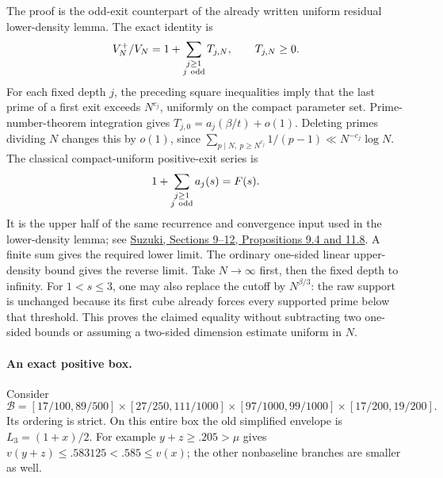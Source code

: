 \documentclass[11pt]{article}
\begin{document}
The proof is the odd-exit counterpart of the already written
uniform residual lower-density lemma. The exact identity is
\[
 V_N^+/V_N=1+\sum_{\substack{j\ge1\\j\ {\rm odd}}}T_{j,N},
 \qquad T_{j,N}\ge0.
\]
For each fixed depth \(j\), the preceding square inequalities imply
that the last prime of a first exit exceeds \(N^{c_j}\), uniformly
on the compact parameter set. Prime-number-theorem integration gives
\(T_{j,0}=a_j(\beta/t)+o(1)\).
Deleting primes dividing \(N\) changes this by \(o(1)\), since
\(\sum_{p\mid N,\ p\ge N^{c_j}}1/(p-1)
 \ll N^{-c_j}\log N\).
The classical compact-uniform positive-exit series is
\[
 1+\sum_{\substack{j\ge1\\j\ {\rm odd}}}a_j(s)=F(s).
\]
It is the upper half of the same recurrence and convergence input
used in the lower-density lemma; see
\href{https://www.suzuyu1729.com/notes/NagoyaSeminar2022/RosserIwaniec.pdf}
{Suzuki, Sections 9--12, Propositions 9.4 and 11.8}.
A finite sum gives the required lower limit. The ordinary one-sided
linear upper-density bound gives the reverse limit.
Take \(N\to\infty\) first, then the fixed depth to infinity.
For \(1<s\le3\), one may also replace the cutoff by \(N^{\beta/3}\):
the raw support is unchanged because its first cube already forces
every supported prime below that threshold.
This proves the claimed equality without subtracting two one-sided
bounds or assuming a two-sided dimension estimate uniform in \(N\).

\paragraph{An exact positive box.}
Consider
\[
 \mathcal B=
 [17/100,89/500]\times[27/250,111/1000]
 \times[97/1000,99/1000]\times[17/200,19/200].
\]
Its ordering is strict. On this entire box the old simplified
envelope is \(L_3=(1+x)/2\).
For example \(y+z\ge.205>\mu\) gives
\(v(y+z)\le.583125<.585\le v(x)\); the other nonbaseline
branches are smaller as well.
\end{document}
